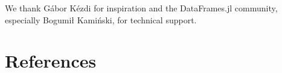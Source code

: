 \documentclass{juliacon}
\begin{document}
\backmatter


We thank Gábor Kézdi for inspiration and the DataFrames.jl community, especially Bogumił Kamiński, for technical support.

\section*{References}
\begingroup
\setlength{\parindent}{0pt}
\setlength{\parskip}{2pt}
\def\small{\small}




\endgroup
\end{document}
